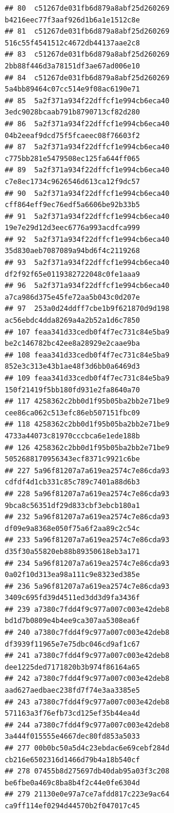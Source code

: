 \documentclass[]{article}
\begin{document}
\begin{verbatim}
## 80  c51267de031fb6d879a8abf25d260269   b4216eec77f3aaf926d1b6a1e1512c8e
## 81  c51267de031fb6d879a8abf25d260269   516c55f4541512c4672db44137aae2c8
## 83  c51267de031fb6d879a8abf25d260269   2bb88f446d3a78151df3ae67ad006e10
## 84  c51267de031fb6d879a8abf25d260269   5a4bb89464c07cc514e9f08ac6190e71
## 85  5a2f371a934f22dffcf1e994cb6eca40   3edc9028bcaab791b8790713cf82d280
## 86  5a2f371a934f22dffcf1e994cb6eca40   04b2eeaf9dcd75f5fcaeec08f76603f2
## 87  5a2f371a934f22dffcf1e994cb6eca40   c775bb281e5479508ec125fa644ff065
## 89  5a2f371a934f22dffcf1e994cb6eca40   c7e8ec1734c9626546d613ca12f9dc57
## 90  5a2f371a934f22dffcf1e994cb6eca40   cff864eff9ec76edf5a6606be92b33b5
## 91  5a2f371a934f22dffcf1e994cb6eca40   19e7e29d12d3eec6776a993acdfca999
## 92  5a2f371a934f22dffcf1e994cb6eca40   35d830aeb7087089a94bd6f4c2119268
## 93  5a2f371a934f22dffcf1e994cb6eca40   df2f92f65e0119382722048c0fe1aaa9
## 96  5a2f371a934f22dffcf1e994cb6eca40   a7ca986d375e45fe72aa5b043c0d207e
## 97  253a0d24ddff7cbe1b9f621870d9d198   ac56ebdc4dda8269a4a2b52a1d6c7850
## 107 feaa341d33cedb0f4f7ec731c84e5ba9   be2c146782bc42ee8a28929e2caae9ba
## 108 feaa341d33cedb0f4f7ec731c84e5ba9   852e3c313e43b1ae48f3d6bb0a6469d3
## 109 feaa341d33cedb0f4f7ec731c84e5ba9   150f21419f5bb180fd931e2fa8640a70
## 117 4258362c2bb0d1f95b05ba2bb2e71be9   cee86ca062c513efc86eb507151fbc09
## 118 4258362c2bb0d1f95b05ba2bb2e71be9   4733a44073c81970cccbca6e1ede188b
## 126 4258362c2bb0d1f95b05ba2bb2e71be9   5052688170956343ecf8371c9921c6be
## 227 5a96f81207a7a619ea2574c7e86cda93   cdfdf4d1cb331c85c789c7401a88d6b3
## 228 5a96f81207a7a619ea2574c7e86cda93   9bca8c56351df29d833cbf3ebcb180a1
## 232 5a96f81207a7a619ea2574c7e86cda93   df09e9a8368e050f75a6f2aa89c2c54c
## 233 5a96f81207a7a619ea2574c7e86cda93   d35f30a55820eb88b89350618eb3a171
## 234 5a96f81207a7a619ea2574c7e86cda93   0a02f10d313ea98a111c9e8323ed385e
## 236 5a96f81207a7a619ea2574c7e86cda93   3409c695fd39d4511ed3dd3d9fa3436f
## 239 a7380c7fdd4f9c977a007c003e42deb8   bd1d7b0809e4b4ee9ca307aa5308ea6f
## 240 a7380c7fdd4f9c977a007c003e42deb8   df3939f11965e7e75dbc046cd9af1c67
## 241 a7380c7fdd4f9c977a007c003e42deb8   dee1225ded7171820b3b974f86164a65
## 242 a7380c7fdd4f9c977a007c003e42deb8   aad627aedbaec238fd7f74e3aa3385e5
## 243 a7380c7fdd4f9c977a007c003e42deb8   571163a3f76efb73cd125ef35b44ea4d
## 244 a7380c7fdd4f9c977a007c003e42deb8   3a444f015555e4667dec80fd853a5033
## 277 00b0bc50a5d4c23ebdac6e69cebf284d   cb216e6502316d1466d79b4a18b540cf
## 278 07455b8d275697db40dab95a03f3c208   be6fbe0a469c8ba8b4f2c44e0fe6304d
## 279 21130e0e97a7ce7afdd817c223e9ac64   ca9ff114ef0294d44570b2f047017c45

\end{verbatim}
\end{document}
